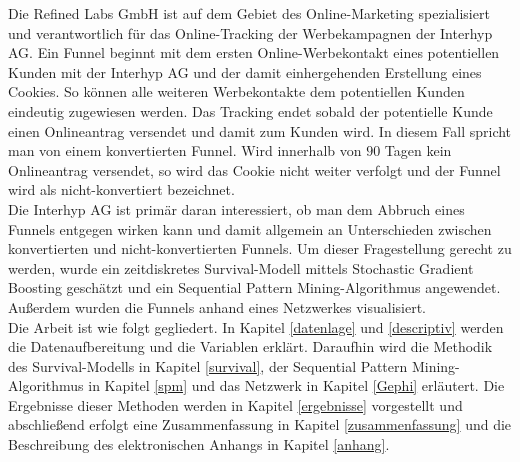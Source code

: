 Die Refined Labs GmbH ist auf dem Gebiet des Online-Marketing spezialisiert und verantwortlich für das Online-Tracking der Werbekampagnen der Interhyp AG. Ein Funnel beginnt mit dem ersten Online-Werbekontakt eines potentiellen Kunden mit der Interhyp AG und der damit einhergehenden Erstellung eines Cookies. So können alle weiteren Werbekontakte dem potentiellen Kunden eindeutig zugewiesen werden. Das Tracking endet sobald der potentielle Kunde einen Onlineantrag versendet und damit zum Kunden wird. In diesem Fall spricht man von einem konvertierten Funnel. Wird innerhalb von $90$ Tagen kein Onlineantrag versendet, so wird das Cookie nicht weiter verfolgt und der Funnel wird als nicht-konvertiert bezeichnet.\\
Die Interhyp AG ist primär daran interessiert, ob man dem Abbruch eines Funnels entgegen wirken kann und damit allgemein an Unterschieden zwischen konvertierten und nicht-konvertierten Funnels. Um dieser Fragestellung gerecht zu werden, wurde ein zeitdiskretes Survival-Modell mittels Stochastic Gradient Boosting geschätzt und ein Sequential Pattern Mining-Algorithmus angewendet. Außerdem wurden die Funnels anhand eines Netzwerkes visualisiert.\\
Die Arbeit ist wie folgt gegliedert. In Kapitel \ref{datenlage} und \ref{descriptiv} werden die Datenaufbereitung und die Variablen erklärt. Daraufhin wird die Methodik des Survival-Modells in Kapitel \ref{survival}, der Sequential Pattern Mining-Algorithmus in Kapitel \ref{spm} und das Netzwerk in Kapitel \ref{Gephi} erläutert. Die Ergebnisse dieser Methoden werden in Kapitel \ref{ergebnisse} vorgestellt und abschließend erfolgt eine Zusammenfassung in Kapitel \ref{zusammenfassung} und die Beschreibung des elektronischen Anhangs in Kapitel \ref{anhang}.